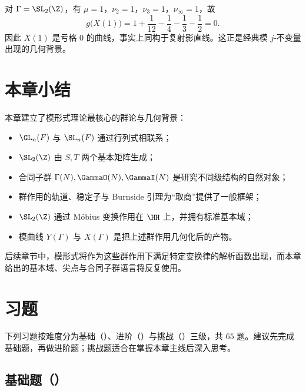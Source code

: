 \begin{example}
对 $\Gamma=\SL_2(\Z)$，有 $\mu=1$，$\nu_2=1$，$\nu_3=1$，$\nu_{\infty}=1$，故
\[
g\bigl(X(1)\bigr)=1+\frac1{12}-\frac14-\frac13-\frac12=0.
\]
因此 $X(1)$ 是亏格 $0$ 的曲线，事实上同构于复射影直线。这正是经典模 $j$-不变量出现的几何背景。
\end{example}

\section*{本章小结}

本章建立了模形式理论最核心的群论与几何背景：
\begin{itemize}
  \item $\GL_n(F)$ 与 $\SL_n(F)$ 通过行列式相联系；
  \item $\SL_2(\Z)$ 由 $S,T$ 两个基本矩阵生成；
  \item 合同子群 $\Gamma(N),\GammaO(N),\GammaI(N)$ 是研究不同级结构的自然对象；
  \item 群作用的轨道、稳定子与 Burnside 引理为“取商”提供了一般框架；
  \item $\SL_2(\Z)$ 通过 Möbius 变换作用在 $\HH$ 上，并拥有标准基本域；
  \item 模曲线 $Y(\Gamma)$ 与 $X(\Gamma)$ 是把上述群作用几何化后的产物。
\end{itemize}
后续章节中，模形式将作为这些群作用下满足特定变换律的解析函数出现，而本章给出的基本域、尖点与合同子群语言将反复使用。

\section*{习题}

下列习题按难度分为基础（\basic）、进阶（\medium）与挑战（\hard）三级，共 $65$ 题。建议先完成基础题，再做进阶题；挑战题适合在掌握本章主线后深入思考。

\subsection*{基础题（\basic）}

